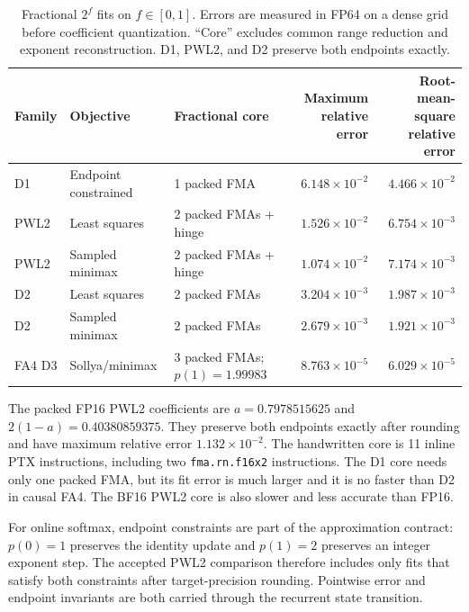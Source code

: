 \begin{table}[H]
\centering
\reporttablefont
\caption{Fractional $2^f$ fits on $f\in[0,1]$. Errors are measured in FP64 on
a dense grid before coefficient quantization. ``Core'' excludes common range
reduction and exponent reconstruction. D1, PWL2, and D2 preserve both
endpoints exactly.}
\label{tab:exp2-fits}
\begin{tabularx}{\textwidth}{@{}llXrr@{}}
\toprule
\textbf{Family} & \textbf{Objective} & \textbf{Fractional core} &
\shortstack{\textbf{Maximum relative}\\\textbf{error}} &
\shortstack{\textbf{Root-mean-square}\\\textbf{relative error}} \\
\midrule
D1 & Endpoint constrained & 1 packed FMA & $6.148\times10^{-2}$ & $4.466\times10^{-2}$ \\
PWL2 & Least squares & 2 packed FMAs + hinge & $1.526\times10^{-2}$ & $6.754\times10^{-3}$ \\
PWL2 & Sampled minimax & 2 packed FMAs + hinge & $1.074\times10^{-2}$ & $7.174\times10^{-3}$ \\
D2 & Least squares & 2 packed FMAs & $3.204\times10^{-3}$ & $1.987\times10^{-3}$ \\
D2 & Sampled minimax & 2 packed FMAs & $2.679\times10^{-3}$ & $1.921\times10^{-3}$ \\
FA4 D3 & Sollya/minimax & 3 packed FMAs; $p(1)=1.99983$ & $8.763\times10^{-5}$ & $6.029\times10^{-5}$ \\
\bottomrule
\end{tabularx}
\end{table}

The packed FP16 PWL2 coefficients are $a=0.7978515625$ and
$2(1-a)=0.40380859375$. They preserve both endpoints exactly after rounding
and have maximum relative error $1.132\times10^{-2}$. The handwritten core is
11 inline PTX instructions, including two \texttt{fma.rn.f16x2}
instructions. The D1 core needs only one packed FMA, but its fit error is much
larger and it is no faster than D2 in causal FA4. The BF16 PWL2 core is also
slower and less accurate than FP16.

For online softmax, endpoint constraints are part of the approximation
contract: $p(0)=1$ preserves the identity update and $p(1)=2$ preserves an
integer exponent step. The accepted PWL2 comparison therefore includes only
fits that satisfy both constraints after target-precision rounding. Pointwise
error and endpoint invariants are both carried through the recurrent state
transition.

